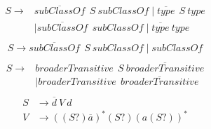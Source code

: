 \begin{align}
\begin{split}
\label{eqn:g_1}
S \to & \overline{\textit{subClassOf}} \ \ S \ \textit{subClassOf} \mid \overline{\textit{type}} \ \ S \ \textit{type}\\   & \mid \overline{\textit{subClassOf}} \ \ \textit{subClassOf} \mid \overline{\textit{type}} \ \textit{type}
\end{split}
\end{align}
\begin{align}
\begin{split}
\label{eqn:g_2}
S \to \overline{\textit{subClassOf}} \ \ S \ \textit{subClassOf} \mid \textit{subClassOf}
\end{split}
\end{align}
\begin{align}
\begin{split}
\label{eqn:geo}
S \to & \textit{broaderTransitive} \ \  S \ \overline{\textit{broaderTransitive}} \\
      & \mid \textit{broaderTransitive} \ \  \overline{\textit{broaderTransitive}}
\end{split}
\end{align}
\begin{align}
\begin{split}
\label{eqn:ma}
S & \to \overline{d} \ V \ d \\
V & \to ((S?) \overline{a})^* (S?) (a (S?))^*
\end{split}
\end{align}

